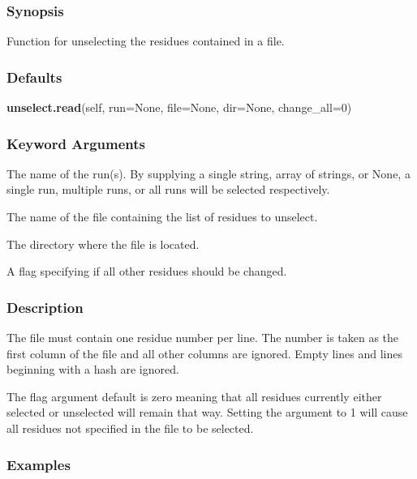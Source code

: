   
 \subsubsection{Synopsis} 

 Function for unselecting the residues contained in a file. 
  

  
 \subsubsection{Defaults} 

 \textsf{\textbf{unselect.read}(self, run=None, file=None, dir=None, change\_all=0)} 

  
 \subsubsection{Keyword Arguments} 

   The name of the run(s).  By supplying a single string, array of strings, or None, a single run, multiple runs, or all runs will be selected respectively.   

   The name of the file containing the list of residues to unselect.   

   The directory where the file is located.   

   A flag specifying if all other residues should be changed.  

  

  
 \subsubsection{Description} 

 The file must contain one residue number per line.  The number is taken as the first column of the file and all other columns are ignored.  Empty lines and lines beginning with a hash are ignored. 
  

 The  flag argument default is zero meaning that all residues currently either selected or unselected will remain that way.  Setting the argument to 1 will cause all residues not specified in the file to be selected. 
  

  
 \subsubsection{Examples} 

